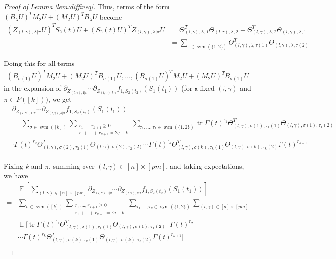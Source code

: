 \documentclass[11pt]{amsart}
\numberwithin{equation}{section}
\numberwithin{equation}{section}
\DeclareMathOperator{\E}{\mathbb{E}}
\DeclareMathOperator*{\tr}{tr}
\DeclareMathOperator{\sym}{sym}
\theoremstyle{remark}
\theoremstyle{definition}
\begin{document}
\begin{proof}[Proof of Lemma \ref{lem:diffineq}]
Thus, terms of the form $(B_{\lambda}U)^TM_2U+(M_2U)^TB_{\lambda}U$ become
\begin{align*}
    (Z_{(l,\gamma),\lambda|\pi}U)^TS_2(t)U + (S_2(t)U)^TZ_{(l,\gamma),\lambda|\pi}U &= \Theta_{(l,\gamma), \lambda, 1}^T\Theta_{(l,\gamma), \lambda, 2} + \Theta_{(l,\gamma), \lambda, 2}^T\Theta_{(l,\gamma), \lambda, 1} \\
    &= \sum_{\tau \in \sym(\{1,2\})} \Theta_{(l,\gamma), \lambda, \tau(1)}^T \Theta_{(l,\gamma), \lambda, \tau(2)}
\end{align*}

Doing this for all terms \begin{align*}(B_{\sigma(1)}U)^TM_2U+(M_2U)^TB_{\sigma(1)}U, \ldots, (B_{\sigma(1)}U)^TM_2U+(M_2U)^TB_{\sigma(1)}U\end{align*} in the expansion of $\partial_{Z_{(l,\gamma),1|\pi}}\cdots\partial_{Z_{(l,\gamma),k|\pi}} \allowbreak f_{1,S_2(t_2)}(S_1(t_1))$ (for a fixed $(l, \gamma)$ and $\pi \in P([k])$), we get
\begin{align*}
&\partial_{Z_{(l,\gamma),1|\pi}}\cdots\partial_{Z_{(l,\gamma),k|\pi}}  f_{1,S_2(t_2)}(S_1(t_1)) \\ 
    &= \sum_{\sigma \in \sym([k])} \sum_{\substack{r_1,\ldots,r_{k+1}\ge 0\\
	r_1+\cdots+r_{k+1}=2q-k}}
	 \sum_{\tau_1,...,\tau_k \in \sym(\{1,2\})}
	\tr \Gamma(t)^{r_1} \Theta_{(l,\gamma), \sigma(1), \tau_1(1)}^T \Theta_{(l,\gamma), \sigma(1), \tau_1(2)} \\& \cdot
	\Gamma(t)^{r_2}\Theta_{(l,\gamma), \sigma(2), \tau_2(1)}^T \Theta_{(l,\gamma), \sigma(2), \tau_2(2)}\cdots
\Gamma(t)^{r_k}\Theta_{(l,\gamma), \sigma(k), \tau_k(1)}^T \Theta_{(l,\gamma), \sigma(k), \tau_k(2)} \Gamma(t)^{r_{k+1}} \\
\end{align*}

Fixing $k$ and $\pi$, summing over $(l, \gamma) \in [n] \times [pm]$, and taking expectations, we have
\begin{align*}
    & \E \left[ \sum_{(l,\gamma) \in [n] \times [pm]} \partial_{Z_{(l,\gamma),1|\pi}}\cdots\partial_{Z_{(l,\gamma),k|\pi}}  f_{1,S_2(t_2)}(S_1(t_1))  \right] \\ 
    =& \sum_{\sigma \in \sym([k])} \sum_{\substack{r_1,\ldots,r_{k+1}\ge 0\\
	r_1+\cdots+r_{k+1}=2q-k}}
	 \sum_{\tau_1,...,\tau_k \in \sym(\{1,2\})}  
	 \sum_{(l,\gamma) \in [n] \times [pm]} \\& \E [ \tr \Gamma(t)^{r_1} \Theta_{(l,\gamma), \sigma(1), \tau_1(1)}^T \Theta_{(l,\gamma), \sigma(1), \tau_1(2)} \cdot
	\Gamma(t)^{r_2} \\&\cdots \Gamma(t)^{r_k}\Theta_{(l,\gamma), \sigma(k), \tau_k(1)}^T \Theta_{(l,\gamma), \sigma(k), \tau_k(2)} \Gamma(t)^{r_{k+1}} ] \\
\end{align*}


\end{proof}
\end{document}
